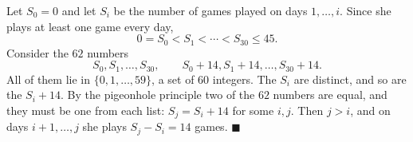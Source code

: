 Let \(S_0=0\) and let \(S_i\) be the number of games played on days \(1,\dots,i\). Since she plays at least one game every day,
\[
0=S_0<S_1<\cdots<S_{30}\le 45.
\]
Consider the \(62\) numbers
\[
S_0,S_1,\dots,S_{30},\qquad S_0+14,S_1+14,\dots,S_{30}+14 .
\]
All of them lie in \(\{0,1,\dots,59\}\), a set of \(60\) integers. The \(S_i\) are distinct, and so are the \(S_i+14\). By the pigeonhole principle two of the \(62\) numbers are equal, and they must be one from each list: \(S_j=S_i+14\) for some \(i,j\). Then \(j>i\), and on days \(i+1,\dots,j\) she plays \(S_j-S_i=14\) games. \(\blacksquare\)
